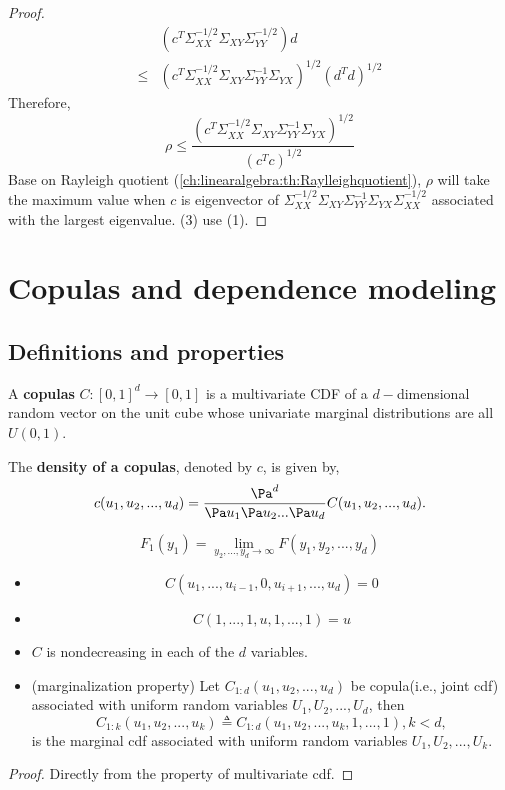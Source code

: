 \begin{refsection}
\begin{proof}
\begin{align*}
& (c^T\Sigma_{XX}^{-1/2}\Sigma_{XY}\Sigma_{YY}^{-1/2})d \\
\leq & (c^T\Sigma_{XX}^{-1/2}\Sigma_{XY}\Sigma_{YY}^{-1}\Sigma_{YX})^{1/2}(d^Td)^{1/2} 
\end{align*}
Therefore, 
$$ \rho \leq  \frac{(c^T\Sigma_{XX}^{-1/2}\Sigma_{XY}\Sigma_{YY}^{-1}\Sigma_{YX})^{1/2}}{(c^Tc)^{1/2}} $$
Base on Rayleigh quotient (\autoref{ch:linearalgebra:th:Raylleighquotient}), $\rho$ will take the maximum value when $c$ is eigenvector of $\Sigma_{XX}^{-1/2}\Sigma_{XY}\Sigma_{YY}^{-1}\Sigma_{YX}\Sigma_{XX}^{-1/2}$ associated with the largest eigenvalue.
(3) use (1). 
\end{proof}





\section{Copulas and dependence modeling}
\subsection{Definitions and properties}
\begin{definition}
A \textbf{copulas} $C:[0,1]^d\to [0,1]$ is a multivariate CDF of a $d-$dimensional random vector on the unit cube whose univariate marginal distributions are all $U(0,1)$.

The \textbf{density of a copulas}, denoted by $c$, is given by,
$$c(u_1,u_2,...,u_d) = \frac{\Pa^d}{\Pa u_1\Pa u_2... \Pa u_d}C(u_1,u_2,...,u_d).$$  
\end{definition}

\begin{note}
	
	$$F_1(y_1) = \lim_{y_2,...,y_d\to \infty} F(y_1,y_2,...,y_d)$$
\end{note}

\begin{lemma}\label{ch:statistical-models:th:basicpropertiesofcopulas}\hfill
\begin{itemize}
	\item 	$$C(u_1,...,u_{i-1},0,u_{i+1},...,u_d) = 0$$
	\item $$C(1,...,1,u,1,...,1) = u$$
	\item $C$ is nondecreasing in each of the $d$ variables.
	\item (marginalization property) Let $C_{1:d}(u_1,u_2,...,u_d)$ be copula(i.e., joint cdf) associated with uniform random variables $U_1,U_2,...,U_d$, then 
	$$C_{1:k}(u_1,u_2,...,u_k) \triangleq C_{1:d}(u_1,u_2,...,u_k,1,...,1),k < d,$$
	is the marginal cdf associated with uniform random variables $U_1,U_2,...,U_k$.
\end{itemize}
\end{lemma}
\begin{proof}
Directly from the property of multivariate cdf.
\end{proof}


\end{refsection}
